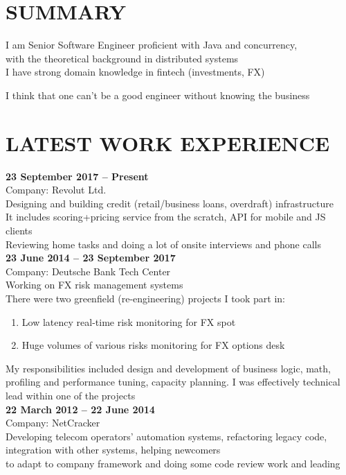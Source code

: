 \documentclass[margin,12pt]{res}
\begin{document}
  \address{
    kremsnx@gmail.com\\
    +7 (985) 9-64-8-512}

\begin{resume}
\section{SUMMARY}
I am Senior Software Engineer proficient with Java and concurrency, \\
with the theoretical background in distributed systems\\
I have strong domain knowledge in fintech (investments, FX)

\vspace{-5pt}
I think that one can't be a good engineer without knowing the business

\section{LATEST WORK EXPERIENCE}
\textbf{23 September 2017 -- Present}\\
Company: Revolut Ltd.\\
Designing and building credit (retail/business loans, overdraft) infrastructure\\
It includes scoring+pricing service from the scratch, API for mobile and JS\\ clients\\
Reviewing home tasks and doing a lot of onsite interviews and phone calls\\
\newline
\textbf{23 June 2014 -- 23 September 2017}\\
Company: Deutsche Bank Tech Center\\
Working on FX risk management systems\\
There were two greenfield (re-engineering) projects I took part in:
\begin{enumerate}
    \item Low latency real-time risk monitoring for FX spot 
    \vspace{-5pt}
    \item Huge volumes of various risks monitoring for FX options desk
\end{enumerate}
\vspace{-14pt}
My responsibilities included design and development of business logic, math,\\ 
profiling and performance tuning, capacity planning. I was effectively technical\\
 lead within one of the projects\\
\newline
\textbf{22 March 2012 -- 22 June 2014}\\
Company: NetCracker\\
Developing telecom operators' automation systems, refactoring legacy code, \\
integration with other systems, helping newcomers\\
to adapt to company framework and doing some code review work and leading


\end{resume}
\end{document}

